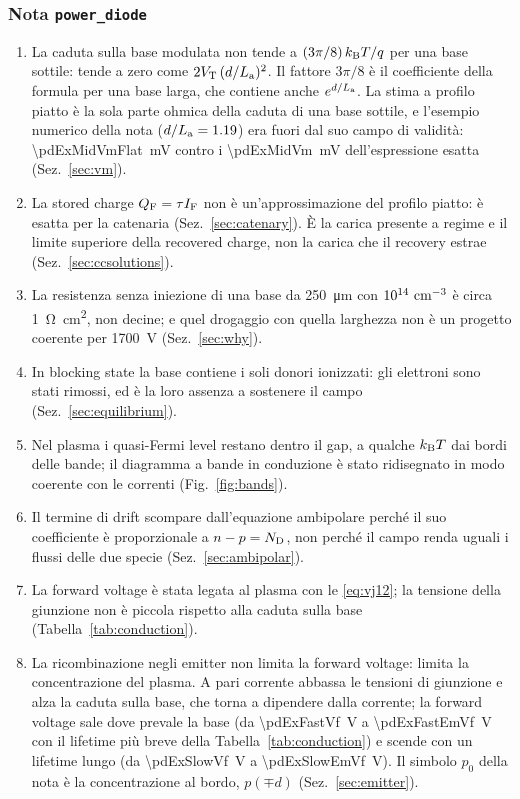 \documentclass[10pt,a4paper]{scrartcl}
\let\newcommand\pdvaluedefine
\newcommand{\IF}{I_\mathrm{F}}
\newcommand{\VT}{V_\mathrm{T}}
\newcommand{\ND}{N_\mathrm{D}}
\newcommand{\La}{L_\mathrm{a}}
\newcommand{\QF}{Q_\mathrm{F}}
\newcommand{\kB}{k_\mathrm{B}}
\newcommand{\Nm}{n\textsuperscript{--}}
\newcommand{\Np}{n\textsuperscript{+}}
\newcommand{\cmc}{\si{\centi\metre^{-3}}}
\begin{document}
\subsubsection*{Nota \texttt{power\_diode}}
\begin{enumerate}
\item La caduta sulla base modulata non tende a $(3\pi/8)\,\kB T/q$ per una base sottile: tende a zero come $2\VT\,(d/\La)^2$. Il fattore $3\pi/8$ è il coefficiente della formula per una base larga, che contiene anche $e^{d/\La}$. La stima a profilo piatto è la sola parte ohmica della caduta di una base sottile, e l'esempio numerico della nota ($d/\La = \pdExMidBeta$) era fuori dal suo campo di validità: \SI{\pdExMidVmFlat}{\milli\volt} contro i \SI{\pdExMidVm}{\milli\volt} dell'espressione esatta (Sez.~\ref{sec:vm}).
\item La stored charge $\QF = \tau\IF$ non è un'approssimazione del profilo piatto: è esatta per la catenaria (Sez.~\ref{sec:catenary}). È la carica presente a regime e il limite superiore della recovered charge, non la carica che il recovery estrae (Sez.~\ref{sec:ccsolutions}).
\item La resistenza senza iniezione di una base da \SI{250}{\micro\metre} con $10^{14}\ \cmc$ è circa \SI{1}{\ohm\centi\metre\squared}, non decine; e quel drogaggio con quella larghezza non è un progetto coerente per \SI{1700}{\volt} (Sez.~\ref{sec:why}).
\item In blocking state la base contiene i soli donori ionizzati: gli elettroni sono stati rimossi, ed è la loro assenza a sostenere il campo (Sez.~\ref{sec:equilibrium}).
\item Nel plasma i quasi-Fermi level restano dentro il gap, a qualche $\kB T$ dai bordi delle bande; il diagramma a bande in conduzione è stato ridisegnato in modo coerente con le correnti (Fig.~\ref{fig:bands}).
\item Il termine di drift scompare dall'equazione ambipolare perché il suo coefficiente è proporzionale a $n - p = \ND$, non perché il campo renda uguali i flussi delle due specie (Sez.~\ref{sec:ambipolar}).
\item La forward voltage è stata legata al plasma con le \eqref{eq:vj12}; la tensione della giunzione \Nm\Np{} non è piccola rispetto alla caduta sulla base (Tabella~\ref{tab:conduction}).
\item La ricombinazione negli emitter non limita la forward voltage: limita la concentrazione del plasma. A pari corrente abbassa le tensioni di giunzione e alza la caduta sulla base, che torna a dipendere dalla corrente; la forward voltage sale dove prevale la base (da \SI{\pdExFastVf}{\volt} a \SI{\pdExFastEmVf}{\volt} con il lifetime più breve della Tabella~\ref{tab:conduction}) e scende con un lifetime lungo (da \SI{\pdExSlowVf}{\volt} a \SI{\pdExSlowEmVf}{\volt}). Il simbolo $p_0$ della nota è la concentrazione al bordo, $p(\mp d)$ (Sez.~\ref{sec:emitter}).

\end{enumerate}
\end{document}
